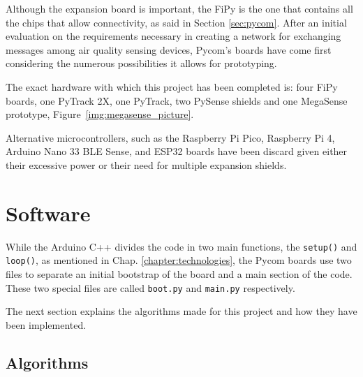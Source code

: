 		Although the expansion board is important, the FiPy is the one that contains all the chips that allow connectivity, as said in Section \ref{sec:pycom}.
		After an initial evaluation on the requirements necessary in creating a network for exchanging messages among air quality sensing devices, Pycom's boards have come first considering the numerous possibilities it allows for prototyping.
		
		The exact hardware with which this project has been completed is: four FiPy boards, one PyTrack 2X, one PyTrack, two PySense shields and one MegaSense prototype, Figure~\ref{img:megasense_picture}.
		
		Alternative microcontrollers, such as the Raspberry Pi Pico, Raspberry Pi 4, Arduino Nano 33 BLE Sense, and ESP32 boards have been discard given either their excessive power or their need for multiple expansion shields.
				
	\section{Software}\label{sec:software_solution}
	
	
	
	
	
		While the Arduino C++ divides the code in two main functions, the \texttt{setup()} and \texttt{loop()}, as mentioned in Chap. \ref{chapter:technologies}, the Pycom boards use two files to separate an initial bootstrap of the board and a main section of the code.
		These two special files are called \texttt{boot.py} and \texttt{main.py} respectively.
		
		The next section explains the algorithms made for this project and how they have been implemented.
		
		
		\subsection{Algorithms}\label{subsec:algorithms}
	
